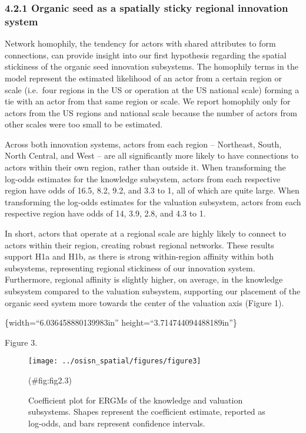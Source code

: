 \documentclass[twoside,12pt,final]{ucthesis-CA2012}
\begin{document}
\begin{ucmainmatter}
{\subsubsection{4.2.1 Organic seed as a spatially sticky regional innovation system}\label{organic-seed-as-a-spatially-sticky-regional-innovation-system}}

Network \textquotesingle homophily\textquotesingle, the tendency for actors with shared attributes to
form connections, can provide insight into our first hypothesis
regarding the spatial stickiness of the organic seed innovation
subsystems. The homophily terms in the model represent the estimated
likelihood of an actor from a certain region or scale (i.e.~four regions
in the US or operation at the US national scale) forming a tie with an
actor from that same region or scale. We report homophily only for
actors from the US regions and national scale because the number of
actors from other scales were too small to be estimated.

Across both innovation systems, actors from each region -- Northeast,
South, North Central, and West -- are all significantly more likely to
have connections to actors within their own region, rather than outside
it. When transforming the log-odds estimates for the knowledge
subsystem, actors from each respective region have odds of 16.5, 8.2,
9.2, and 3.3 to 1, all of which are quite large. When transforming the
log-odds estimates for the valuation subsystem, actors from each
respective region have odds of 14, 3.9, 2.8, and 4.3 to 1.

In short, actors that operate at a regional scale are highly likely to
connect to actors within their region, creating robust regional
networks. These results support H1a and H1b, as there is strong
within-region affinity within both subsystems, representing regional
stickiness of our innovation system. Furthermore, regional affinity is
slightly higher, on average, in the knowledge subsystem compared to the
valuation subsystem, supporting our placement of the organic seed system
more towards the center of the valuation axis (Figure 1).

\{width=``6.036458880139983in''
height=``3.714744094488189in''\}

Figure 3.
\begin{figure}

{\centering \texttt{[image: ../osisn\_spatial/figures/figure3]} 

}

\caption{Coefficient plot for ERGMs of the knowledge and valuation subsystems. Shapes represent the coefficient estimate, reported as log-odds, and bars represent confidence intervals.}(\#fig:fig2.3)
\end{figure}
\hypertarget{vertical-coupling-via-national-scale-bridges}{%
}
\end{ucmainmatter}
\end{document}
